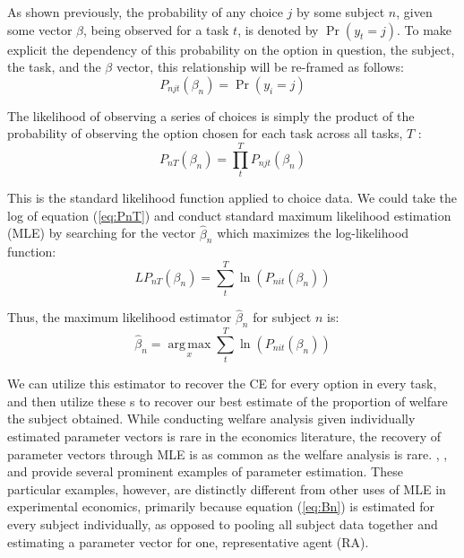 \documentclass[../main.tex]{subfiles}
\begin{document}
As shown previously, the probability of any choice $j$ by some subject $n$, given some vector $\beta$, being observed for a task $t$, is denoted by $\Pr( y_t = j)$.
To make explicit the dependency of this probability on the option in question, the subject, the task, and the $\beta$ vector, this relationship will be re-framed as follows:
\begin{equation}
	\label{eq:Pnjt}
	P_{njt}(\beta_n) = \Pr(y_i = j)
\end{equation}

The likelihood of observing a series of choices is simply the product of the probability of observing the option chosen for each task across all tasks, $T$ :
\begin{equation}
	\label{eq:PnT}
	P_{nT}(\beta_n) =  \prod_{t}^{T} P_{njt}(\beta_n)
\end{equation}

This is the standard likelihood function applied to choice data.
We could take the log of equation (\ref{eq:PnT}) and conduct standard maximum likelihood estimation (MLE) by searching for the vector $\hat{\beta}_n$ which maximizes the log-likelihood function:
\begin{equation}
	\label{eq:LPnT}
	\mathit{LP}_{nT}(\beta_n) = \sum_{t}^{T} \ln \left( P_{nit}(\beta_n) \right)
\end{equation}

Thus, the maximum likelihood estimator $\hat{\beta}_n$ for subject $n$ is:
\begin{equation}
	\label{eq:Bn}
	\hat{\beta}_n = \underset{x}{\operatorname{arg\,max}}\sum_t^T \ln \left( P_{nit}(\beta_n) \right)
\end{equation}

We can utilize this estimator to recover the CE for every option in every task, and then utilize these \CE s to recover our best estimate of the proportion of welfare the subject obtained. 
While conducting welfare analysis given individually estimated parameter vectors is rare in the economics literature,{\footnotemark} the recovery of parameter vectors through MLE is as common as the welfare analysis is rare.
\textcite{Hey1994}, \textcite{Wilcox2015}, and \textcite{Hey2001} provide several prominent examples of parameter estimation.
These particular examples, however, are distinctly different from other uses of MLE in experimental economics, primarily because equation (\ref{eq:Bn}) is estimated for every subject individually, as opposed to pooling all subject data together and estimating a parameter vector for one, representative agent (RA).
\end{document}
